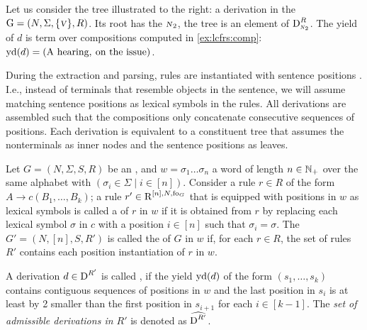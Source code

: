 \documentclass[../../document.tex]{subfiles}
\begin{document}
    \begin{wrapfigure}[6]{r}{0pt}
    \end{wrapfigure}
    \label{ex:lcfrs:deriv}
    Let us consider the tree illustrated to the right: a derivation in the  \(\mathrm{G} = (N, \Sigma, \{\textsc{\textsl{v}}\}, R)\).
    Its root has the  \(\textsc{\textsl{n}}_2\), the tree is an element of \(\operatorname{D}^R_{\textsc{\textsl{n}}_2}\).
    The yield of \(d\) is term over compositions computed in \cref{ex:lcfrs:comp}: \(\operatorname{yd}(d) = (\text{A hearing}, \: \text{on the issue})\).
    \exampleqed

    \vspace{\baselineskip}

    During the extraction and parsing,  rules are instantiated with sentence positions \citep[Definition~6.8]{Kal10}.
    I.e., instead of terminals that resemble objects in the sentence, we will assume matching sentence positions as lexical symbols in the rules.
    All derivations are assembled such that the compositions only concatenate consecutive sequences of positions.
    Each derivation is equivalent to a constituent tree that assumes the  nonterminals as inner nodes and the sentence positions as leaves.

    \begin{definition}
        Let \(G = (N, \varSigma, S, R)\) be an , and \(w = \sigma_1 \ldots \sigma_n\) a word of length \(n \in \mathbb{N}_+\) over the same alphabet with \((\sigma_i \in \varSigma \mid i \in [n])\).
        Consider a rule \(r\in R\) of the form \(A \to c (B_1, \ldots, B_k)\); a rule \(r' \in \operatorname{R}^{[n],N,\operatorname{fo}_G}\) that is equipped with positions in \(w\) as lexical symbols is called a  of \(r\) in \(w\) if it is obtained from \(r\) by replacing each lexical symbol \(\sigma\) in \(c\) with a position \(i \in [n]\) such that \(\sigma_i = \sigma\).
        The  \(G' = (N, [n], S, R')\) is called the  of \(G\) in \(w\) if, for each \(r \in R\), the set of rules \(R'\) contains each position instantiation of \(r\) in \(w\).

        A derivation \(d \in \operatorname{D}^{R'}\) is called , if the yield \(\operatorname{yd}(d)\) of the form \((s_1, \ldots, s_k)\) contains contiguous sequences of positions in \(w\) and the last position in \(s_i\) is at least by 2 smaller than the first position in \(s_{i+1}\) for each \(i \in [k-1]\).
        The \emph{set of admissible derivations in $R'$} is denoted as \(\widehat{\operatorname{D}^{R'}}\).
    \end{definition}
\end{document}
